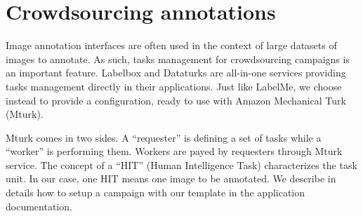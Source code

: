 \section{Crowdsourcing annotations}

Image annotation interfaces are often used in the context
of large datasets of images to annotate.
As such, tasks management for crowdsourcing campaigns is an important feature. 
Labelbox and Dataturks are all-in-one services providing
tasks management directly in their applications.
Just like LabelMe, we choose instead to provide a configuration,
ready to use with Amazon Mechanical Turk (Mturk).

Mturk comes in two sides. A ``requester'' is defining a set of tasks
while a ``worker'' is performing them.
Workers are payed by requesters through Mturk service.
The concept of a ``HIT'' (Human Intelligence Task) characterizes the task unit.
In our case, one HIT means one image to be annotated.
We describe in details how to setup a campaign with our template
in the application documentation.